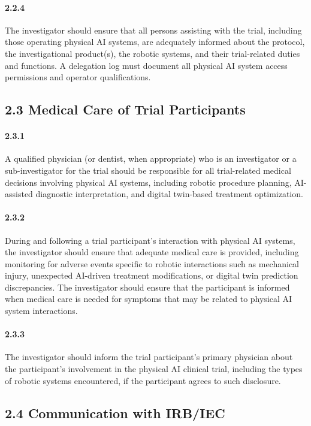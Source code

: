 \documentclass[11pt]{article}
\begin{document}
\paragraph{2.2.4} The investigator should ensure that all persons assisting with the trial, including those operating physical AI systems, are adequately informed about the protocol, the investigational product(s), the robotic systems, and their trial-related duties and functions. A delegation log must document all physical AI system access permissions and operator qualifications.

\subsection{2.3 Medical Care of Trial Participants}

\paragraph{2.3.1} A qualified physician (or dentist, when appropriate) who is an investigator or a sub-investigator for the trial should be responsible for all trial-related medical decisions involving physical AI systems, including robotic procedure planning, AI-assisted diagnostic interpretation, and digital twin-based treatment optimization.

\paragraph{2.3.2} During and following a trial participant's interaction with physical AI systems, the investigator should ensure that adequate medical care is provided, including monitoring for adverse events specific to robotic interactions such as mechanical injury, unexpected AI-driven treatment modifications, or digital twin prediction discrepancies. The investigator should ensure that the participant is informed when medical care is needed for symptoms that may be related to physical AI system interactions.

\paragraph{2.3.3} The investigator should inform the trial participant's primary physician about the participant's involvement in the physical AI clinical trial, including the types of robotic systems encountered, if the participant agrees to such disclosure.

\subsection{2.4 Communication with IRB/IEC}
\end{document}

